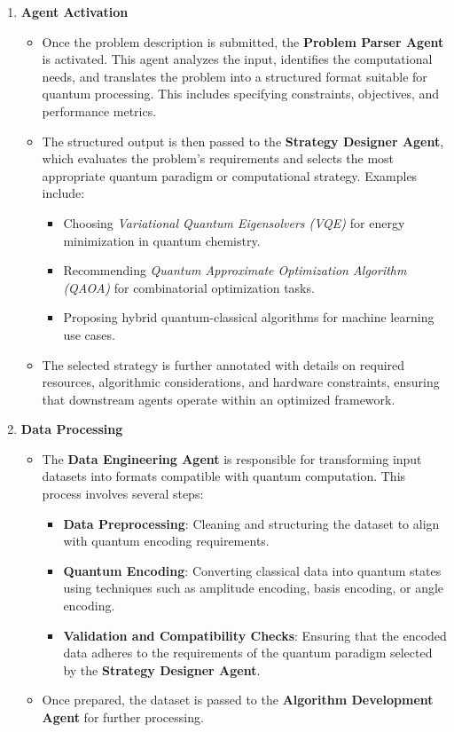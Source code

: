 \documentclass[12pt]{article}
\begin{document}
\begin{enumerate}
    \item \textbf{Agent Activation}
    \begin{itemize}
        \item Once the problem description is submitted, the \textbf{Problem Parser Agent} is activated. This agent analyzes the input, identifies the computational needs, and translates the problem into a structured format suitable for quantum processing. This includes specifying constraints, objectives, and performance metrics.
        \item The structured output is then passed to the \textbf{Strategy Designer Agent}, which evaluates the problem’s requirements and selects the most appropriate quantum paradigm or computational strategy. Examples include:
        \begin{itemize}
            \item Choosing \textit{Variational Quantum Eigensolvers (VQE)} for energy minimization in quantum chemistry.
            \item Recommending \textit{Quantum Approximate Optimization Algorithm (QAOA)} for combinatorial optimization tasks.
            \item Proposing hybrid quantum-classical algorithms for machine learning use cases.
        \end{itemize}
        \item The selected strategy is further annotated with details on required resources, algorithmic considerations, and hardware constraints, ensuring that downstream agents operate within an optimized framework.
    \end{itemize}

    \item \textbf{Data Processing}
    \begin{itemize}
        \item The \textbf{Data Engineering Agent} is responsible for transforming input datasets into formats compatible with quantum computation. This process involves several steps:
        \begin{itemize}
            \item \textbf{Data Preprocessing}: Cleaning and structuring the dataset to align with quantum encoding requirements.
            \item \textbf{Quantum Encoding}: Converting classical data into quantum states using techniques such as amplitude encoding, basis encoding, or angle encoding.
            \item \textbf{Validation and Compatibility Checks}: Ensuring that the encoded data adheres to the requirements of the quantum paradigm selected by the \textbf{Strategy Designer Agent}.
        \end{itemize}
        \item Once prepared, the dataset is passed to the \textbf{Algorithm Development Agent} for further processing.
    \end{itemize}


\end{enumerate}
\end{document}
